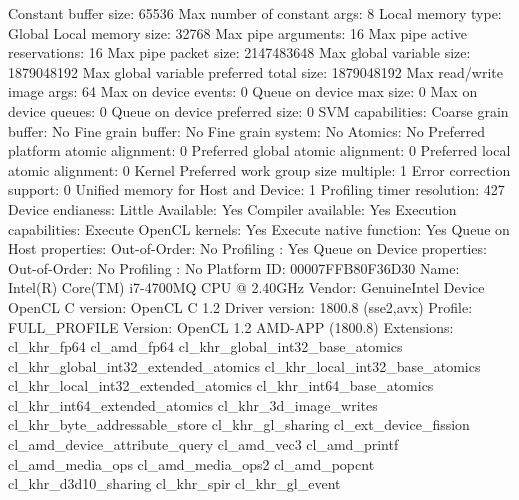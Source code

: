 \begin{codebox}[text]
  Constant buffer size:                          65536
  Max number of constant args:                   8
  Local memory type:                             Global
  Local memory size:                             32768
  Max pipe arguments:                            16
  Max pipe active reservations:                  16
  Max pipe packet size:                          2147483648
  Max global variable size:                      1879048192
  Max global variable preferred total size:      1879048192
  Max read/write image args:                     64
  Max on device events:                          0
  Queue on device max size:                      0
  Max on device queues:                          0
  Queue on device preferred size:                0
  SVM capabilities:
    Coarse grain buffer:                         No
    Fine grain buffer:                           No
    Fine grain system:                           No
    Atomics:                                     No
  Preferred platform atomic alignment:           0
  Preferred global atomic alignment:             0
  Preferred local atomic alignment:              0
  Kernel Preferred work group size multiple:     1
  Error correction support:                      0
  Unified memory for Host and Device:            1
  Profiling timer resolution:                    427
  Device endianess:                              Little
  Available:                                     Yes
  Compiler available:                            Yes
  Execution capabilities:
    Execute OpenCL kernels:                      Yes
    Execute native function:                     Yes
  Queue on Host properties:
    Out-of-Order:                                No
    Profiling :                                  Yes
  Queue on Device properties:
    Out-of-Order:                                No
    Profiling :                                  No
  Platform ID:                                   00007FFB80F36D30
  Name:                                          Intel(R) Core(TM) i7-4700MQ CPU @ 2.40GHz
  Vendor:                                        GenuineIntel
  Device OpenCL C version:                       OpenCL C 1.2
  Driver version:                                1800.8 (sse2,avx)
  Profile:                                       FULL_PROFILE
  Version:                                       OpenCL 1.2 AMD-APP (1800.8)
  Extensions:
   cl_khr_fp64
   cl_amd_fp64
   cl_khr_global_int32_base_atomics
   cl_khr_global_int32_extended_atomics
   cl_khr_local_int32_base_atomics
   cl_khr_local_int32_extended_atomics
   cl_khr_int64_base_atomics
   cl_khr_int64_extended_atomics
   cl_khr_3d_image_writes
   cl_khr_byte_addressable_store
   cl_khr_gl_sharing
   cl_ext_device_fission
   cl_amd_device_attribute_query
   cl_amd_vec3
   cl_amd_printf
   cl_amd_media_ops
   cl_amd_media_ops2
   cl_amd_popcnt
   cl_khr_d3d10_sharing
   cl_khr_spir
   cl_khr_gl_event
\end{codebox}

